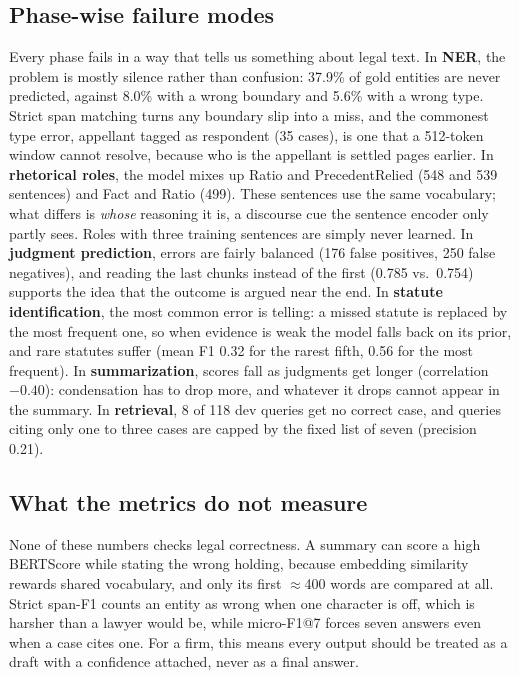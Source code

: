 \documentclass[11pt, oneside]{article}
\begin{document}
\subsection{Phase-wise failure modes}
Every phase fails in a way that tells us something about legal text.  In \textbf{NER}, the problem is mostly
silence rather than confusion: 37.9\% of gold entities are never predicted, against 8.0\% with a wrong boundary
and 5.6\% with a wrong type.  Strict span matching turns any boundary slip into a miss, and the commonest type
error, appellant tagged as respondent (35 cases), is one that a 512-token window cannot resolve, because who is
the appellant is settled pages earlier.  In \textbf{rhetorical roles}, the model mixes up Ratio and
PrecedentRelied (548 and 539 sentences) and Fact and Ratio (499).  These sentences use the same vocabulary; what
differs is \emph{whose} reasoning it is, a discourse cue the sentence encoder only partly sees.  Roles with three
training sentences are simply never learned.  In \textbf{judgment prediction}, errors are fairly balanced (176
false positives, 250 false negatives), and reading the last chunks instead of the first (0.785 vs.\ 0.754)
supports the idea that the outcome is argued near the end.  In \textbf{statute identification}, the most common
error is telling: a missed statute is replaced by the most frequent one, so when evidence is weak the model falls
back on its prior, and rare statutes suffer (mean F1 0.32 for the rarest fifth, 0.56 for the most frequent).  In
\textbf{summarization}, scores fall as judgments get longer (correlation $-0.40$): condensation has to drop more,
and whatever it drops cannot appear in the summary.  In \textbf{retrieval}, 8 of 118 dev queries get no correct
case, and queries citing only one to three cases are capped by the fixed list of seven (precision 0.21).

\subsection{What the metrics do not measure}
None of these numbers checks legal correctness.  A summary can score a high BERTScore while stating the wrong
holding, because embedding similarity rewards shared vocabulary, and only its first $\approx$400 words are
compared at all.  Strict span-F1 counts an entity as wrong when one character is off, which is harsher than a
lawyer would be, while micro-F1@7 forces seven answers even when a case cites one.  For a firm, this means every
output should be treated as a draft with a confidence attached, never as a final answer.
\end{document}
